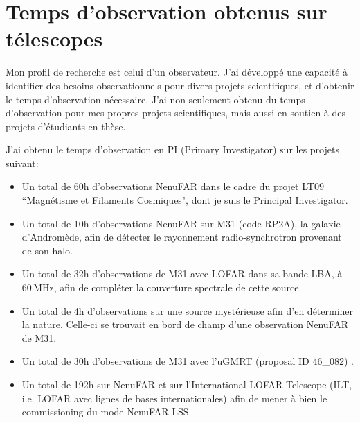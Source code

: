 


\chapter{Temps d'observation obtenus sur t\'elescopes} 

\pg
Mon profil de recherche est celui d'un observateur. J'ai d\'evelopp\'e une capacit\'e \`a identifier des besoins observationnels pour divers projets scientifiques, et d'obtenir le temps d'observation n\'ecessaire. J'ai non seulement obtenu du temps d'observation pour mes propres projets scientifiques, mais aussi en soutien \`a des projets d'\'etudiants en th\`ese.

\pg
J'ai obtenu le temps d'observation en PI (Primary Investigator) sur les projets suivant:
\begin{itemize}
	\item Un total de 60h d'observations NenuFAR dans le cadre du projet LT09 ``Magn\'etisme et Filaments Cosmiques", dont je suis le Principal Investigator.
	\item Un total de 10h d'observations NenuFAR sur M31 (code RP2A), la galaxie d'Androm\`ede, afin de d\'etecter le rayonnement radio-synchrotron provenant de son halo.
	\item Un total de 32h d'observations de M31 avec LOFAR dans sa bande LBA, \`a 60\,MHz, afin de compl\'eter la couverture spectrale de cette source.
	\item Un total de 4h d'observations sur une source myst\'erieuse afin d'en d\'eterminer la nature. Celle-ci se trouvait en bord de champ d'une observation NenuFAR de M31.
	\item Un total de 30h d'observations de M31 avec l'uGMRT (proposal ID 46\_082) .
	\item Un total de 192h sur NenuFAR et sur l'International LOFAR Telescope (ILT, i.e. LOFAR avec lignes de bases internationales) afin de mener \`a bien le commissioning du mode NenuFAR-LSS.
\end{itemize}

